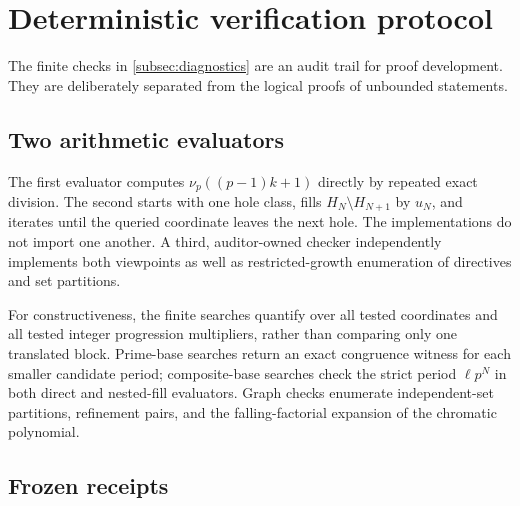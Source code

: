 \section{Deterministic verification protocol}
\label{app:reproducibility}

The finite checks in \cref{subsec:diagnostics} are an audit trail for proof
development.  They are deliberately separated from the logical proofs of
unbounded statements.

\subsection{Two arithmetic evaluators}

The first evaluator computes $\nu_p((p-1)k+1)$ directly by repeated exact
division.  The second starts with one hole class, fills
$H_N\setminus H_{N+1}$ by $u_N$, and iterates until the queried coordinate
leaves the next hole.  The implementations do not import one another.  A
third, auditor-owned checker independently implements both viewpoints as
well as restricted-growth enumeration of directives and set partitions.

For constructiveness, the finite searches quantify over all tested
coordinates and all tested integer progression multipliers, rather than
comparing only one translated block.  Prime-base searches return an exact
congruence witness for each smaller candidate period; composite-base
searches check the strict period $\ell p^N$ in both direct and nested-fill
evaluators.  Graph checks enumerate independent-set partitions, refinement
pairs, and the falling-factorial expansion of the chromatic polynomial.

\subsection{Frozen receipts}

